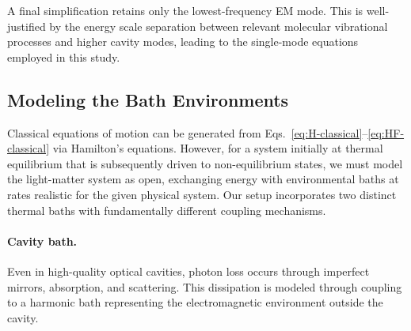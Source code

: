 \documentclass[%
 reprint,
 amsmath,amssymb,
 aps,
]{revtex4-2}
\begin{document}
A final simplification retains only the lowest-frequency EM mode.
This is well-justified by the energy scale separation between relevant molecular vibrational processes and higher cavity modes, leading to the single-mode equations employed in this study.

\subsection{Modeling the Bath Environments}
\label{app:bath}

Classical equations of motion can be generated from Eqs.~\eqref{eq:H-classical}--\eqref{eq:HF-classical} via Hamilton's equations.
However, for a system initially at thermal equilibrium that is subsequently driven to non-equilibrium states, we must model the light-matter system as open, exchanging energy with environmental baths at rates realistic for the given physical system.
Our setup incorporates two distinct thermal baths with fundamentally different coupling mechanisms.

\paragraph{Cavity bath.}
Even in high-quality optical cavities, photon loss occurs through imperfect mirrors, absorption, and scattering.
This dissipation is modeled through coupling to a harmonic bath representing the electromagnetic environment outside the cavity.
\end{document}
